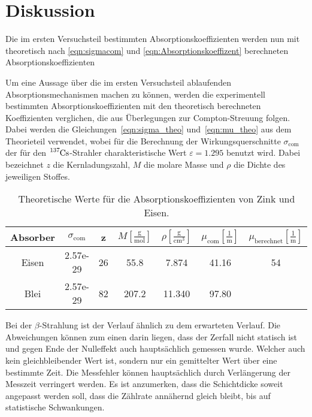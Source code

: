 \section{Diskussion}
\label{sec:Diskussion}

Die im ersten Versuchsteil bestimmten Absorptionskoeffizienten werden nun mit theoretisch nach \autoref{eqn:sigmacom} und
\autoref{eqn:Absorptionskoeffizent} berechneten Absorptionskoeffizienten 


Um eine Aussage über die im ersten Versuchsteil ablaufenden Absorptionsmechanismen
machen zu können, werden die experimentell bestimmten Absorptionskoeffizienten
mit den theoretisch berechneten Koeffizienten verglichen, die aus Überlegungen
zur Compton-Streuung folgen. Dabei werden die Gleichungen~\eqref{eqn:sigma_theo}
und~\eqref{eqn:mu_theo} aus dem Theorieteil verwendet, wobei für die Berechnung
der Wirkungsquerschnitte $\sigma_{\mathup{com}}$ der für den
$\ce{^{137}Cs}$-Strahler charakteristische Wert $\varepsilon = \num{1.295}$
benutzt wird. Dabei bezeichnet $z$ die
Kernladungszahl, $M$ die molare Masse und $\rho$ die Dichte des jeweiligen
Stoffes.


\begin{table}[ht]
    \centering
    \caption{Theoretische Werte für die Absorptionskoeffizienten von Zink und Eisen.}
    \label{tab:theoriewerte}
	\begin{tabular}{S S S S S S S}
			\toprule
			{Absorber} & {$\sigma_{\mathup{com}}$} & {z} & {$M\left[\frac{\si{\gram}}{\si{\mol}}\right]$} &
            {$\rho\left[\frac{\si{\gram}}{\si{\centi\meter\cubed}}\right]$} &
            {$\mu_{\mathup{com}}\left[\frac{1}{\si{\meter}}\right]$} &
            {$\mu_{\mathup{berechnet}}\left[\frac{1}{\si{\meter}}\right]$} \\
			\midrule
			{Eisen} & 2.57e-29 & 26 &  55.8 &  7.874 & 41.16  & 54\\
            {Blei}  & 2.57e-29 & 82 & 207.2 & 11.340 & 97.80 &  \\
			\bottomrule
		\end{tabular}
\end{table}


Bei der $\beta$-Strahlung ist der Verlauf ähnlich zu dem erwarteten Verlauf. Die Abweichungen können zum einen darin liegen, dass der Zerfall 
nicht statisch ist und gegen Ende der Nulleffekt auch hauptsächlich gemessen wurde. Welcher auch kein gleichbleibender Wert ist, sondern nur ein 
gemittelter Wert über eine bestimmte Zeit.
Die Messfehler können hauptsächlich durch Verlängerung der Messzeit verringert werden.
Es ist anzumerken, dass die Schichtdicke soweit angepasst werden soll, dass die Zählrate annähernd gleich bleibt, 
bis auf statistische Schwankungen.
